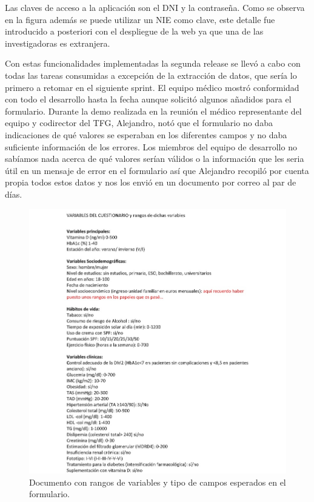 Las claves de acceso a la aplicación son el DNI y la contraseña. Como se observa en la figura además se puede utilizar un NIE como clave, este detalle fue introducido a posteriori con el despliegue de la web ya que una de las investigadoras es extranjera.
\newline

Con estas funcionalidades implementadas la segunda release se llevó a cabo con todas las tareas consumidas a excepción de la extracción de datos, que sería lo primero a retomar en el siguiente sprint. El equipo médico mostró conformidad con todo el desarrollo hasta la fecha aunque solicitó algunos añadidos para el formulario. Durante la demo realizada en la reunión el médico representante del equipo y codirector del TFG, Alejandro, notó que el formulario no daba indicaciones de qué valores se esperaban en los diferentes campos y no daba suficiente información de los errores. Los miembros del equipo de desarrollo no sabíamos nada acerca de qué valores serían válidos o la información que les seria útil en un mensaje de error en el formulario así que Alejandro recopiló por cuenta propia todos estos datos y nos los envió en un documento por correo al par de días.

\begin{figure}[h]
    \centering
     \includegraphics[width=1\textwidth]{images/rangosVariables.jpg}
    \caption{Documento con rangos de variables y tipo de campos esperados en el formulario.}
\end{figure}
\newpage


